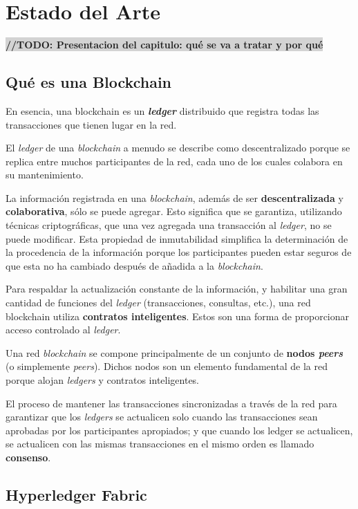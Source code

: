 \chapter{Estado del Arte}\label{chapter:state-of-the-art}


\colorbox{lightgray}{\textbf{//TODO: Presentacion del capitulo: qué se va a tratar y por qué}}

\section{Qué es una Blockchain}
En esencia, una blockchain es un \textbf{\textit{ledger}} distribuido que registra todas las transacciones que tienen lugar en la red.

El \textit{ledger} de una \textit{blockchain} a menudo se describe como descentralizado porque se replica entre muchos participantes de la red, cada uno de los cuales colabora en su mantenimiento.

La información registrada en una \textit{blockchain}, además de ser \textbf{descentralizada} y \textbf{colaborativa}, sólo se puede agregar. Esto significa que se garantiza, utilizando técnicas criptográficas, que una vez  agregada una transacción al \textit{ledger}, no se puede modificar. Esta propiedad de inmutabilidad simplifica la determinación de la procedencia de la información porque los participantes pueden estar seguros de que esta no ha cambiado después de añadida a la \textit{blockchain}.

Para respaldar la actualización constante de la información, y  habilitar una gran cantidad de funciones del \textit{ledger} (transacciones, consultas, etc.), una red  blockchain utiliza \textbf{contratos inteligentes}. Estos son una forma de proporcionar acceso controlado al \textit{ledger}.

Una red  \textit{blockchain} se compone principalmente de un conjunto de \textbf{nodos \textit{peers}} (o simplemente \textit{peers}). Dichos nodos son un elemento fundamental de la red porque alojan \textit{ledgers} y contratos inteligentes.

El proceso de mantener las transacciones sincronizadas a través de la red para garantizar que los \textit{ledgers} se actualicen solo cuando las transacciones sean aprobadas por los participantes apropiados; y que cuando los ledger se actualicen, se actualicen con las mismas transacciones en el mismo orden es llamado \textbf{consenso}.

\section{Hyperledger Fabric}

